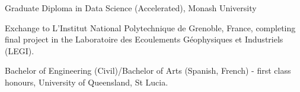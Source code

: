 %
%
%


\begin{scholarship}

					{Graduate Diploma in Data Science (Accelerated), Monash University}

					{Exchange to L'Institut National Polytechnique de Grenoble, France, completing final project in the Laboratoire des Ecoulements Géophysiques et Industriels (LEGI).}
					
					{Bachelor of Engineering (Civil)/Bachelor of Arts (Spanish, French) - first class honours, University of Queensland, St Lucia.}

\end{scholarship}